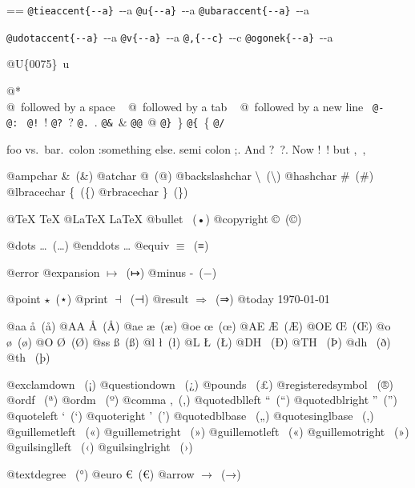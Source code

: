 \documentclass{book}
\makeatletter
\newenvironment{Texinfopreformatted}{%
  \par\GNUTobeylines\obeyspaces\frenchspacing\parskip=\z@\parindent=\z@}{}
{\catcode`\^^M=13 \gdef\GNUTobeylines{\catcode`\^^M=13 \def^^M{\null\par}}}
\newenvironment{Texinfoindented}{\begin{list}{}{}\item\relax}{\end{list}}
\renewcommand{\_}{\Texinfounderscore\discretionary{}{}{}}
\makeatother
\begin{document}
\begin{Texinfoindented}
\begin{Texinfopreformatted}
\texttt{@tieaccent\{{-}{-}a\}}\ \t{{-}{-}a}
\texttt{@u\{{-}{-}a\}}\ \u{{-}{-}a}
\texttt{@ubaraccent\{{-}{-}a\}}\ \b{{-}{-}a}

\texttt{@udotaccent\{{-}{-}a\}}\ \d{{-}{-}a}
\texttt{@v\{{-}{-}a\}}\ \v{{-}{-}a}
\texttt{@,\{{-}{-}c\}}\ \c{{-}{-}c}
\texttt{@ogonek\{{-}{-}a\}}\ \k{{-}{-}a}

@U\{0075\}\ u

@* \leavevmode{}\\
@\ followed by a space
\ {}
@\ followed by a tab
\ {}
@\ followed by a new line
\ {}\texttt{@-}\ \-{}
\texttt{@:}\ \@
\texttt{@!}\ \@!
\texttt{@?}\ \@?
\texttt{@.}\ \@.
\texttt{@\&}\ \&
\texttt{@@}\ @
\texttt{@\}}\ \}
\texttt{@\{}\ \{
\texttt{@/}\ 

foo vs.\@\ bar.\ 
colon :\@And something else.
semi colon ;\@.
And ?\ ?\@.
Now !\ !\@@
but ,\ ,\@

@ampchar \&\ (\&)
@atchar @\ (@)
@backslashchar \textbackslash{}\ (\textbackslash{})
@hashchar \#\ (\#)
@lbracechar \{\ (\{)
@rbracechar \}\ (\})

@TeX \TeX{}
@LaTeX \LaTeX{}
@bullet \textbullet{}\ (•)
@copyright \copyright{}\ (©)

@dots \dots{}\@\ (…)
@enddots \dots{}
@equiv $\equiv{}$\ (≡)

@error 
@expansion $\mapsto{}$\ (↦)
@minus -\ (−)

@point $\star{}$\ (⋆)
@print $\dashv{}$\ (⊣)
@result $\Rightarrow{}$\ (⇒)
@today \today{}

@aa \aa{}\ (å)
@AA \AA{}\ (Å)
@ae \ae{}\ (æ)
@oe \oe{}\ (œ)
@AE \AE{}\ (Æ)
@OE \OE{}\ (Œ)
@o \o{}\ (ø)
@O \O{}\ (Ø)
@ss \ss{}\ (ß)
@l \l{}\ (ł)
@L \L{}\ (Ł)
@DH \DH{}\ (Ð)
@TH \TH{}\ (Þ)
@dh \dh{}\ (ð)
@th \th{}\ (þ)

@exclamdown \textexclamdown{}\ (¡)
@questiondown \textquestiondown{}\ (¿)
@pounds \textsterling{}\ (£)
@registeredsymbol \circledR{}\ (®)
@ordf \textordfeminine{}\ (ª)
@ordm \textordmasculine{}\ (º)
@comma ,\ (,)
@quotedblleft \textquotedblleft{}\ (“)
@quotedblright \textquotedblright{}\ (”)
@quoteleft \textquoteleft{}\ (‘)
@quoteright \textquoteright{}\ (’)
@quotedblbase \quotedblbase{}\ („)
@quotesinglbase \quotesinglbase{}\ (‚)
@guillemetleft \guillemotleft{}\ («)
@guillemetright \guillemotright{}\ (»)
@guillemotleft \guillemotleft{}\ («)
@guillemotright \guillemotright{}\ (»)
@guilsinglleft \guilsinglleft{}\ (‹)
@guilsinglright \guilsinglright{}\ (›)

@textdegree \textdegree{}\ (°)
@euro \euro{}\ (€)
@arrow $\rightarrow{}$\ (→)


\end{Texinfopreformatted}
\end{Texinfoindented}
\end{document}
